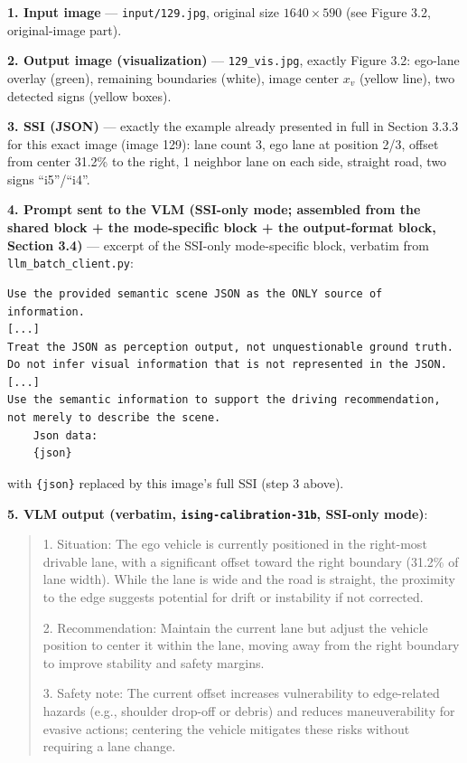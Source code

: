 \documentclass[12pt,a4paper]{report}
\begin{document}
\textbf{1. Input image} --- \texttt{input/129.jpg}, original size $1640 \times 590$ (see Figure 3.2, original-image part).

\textbf{2. Output image (visualization)} --- \texttt{129\_vis.jpg}, exactly Figure 3.2: ego-lane overlay (green), remaining boundaries (white), image center $x_v$ (yellow line), two detected signs (yellow boxes).

\textbf{3. SSI (JSON)} --- exactly the example already presented in full in Section 3.3.3 for this exact image (image 129): lane count 3, ego lane at position 2/3, offset from center 31.2\% to the right, 1 neighbor lane on each side, straight road, two signs ``i5''/``i4''.

\textbf{4. Prompt sent to the VLM (SSI-only mode; assembled from the shared block + the mode-specific block + the output-format block, Section 3.4)} --- excerpt of the SSI-only mode-specific block, verbatim from \texttt{llm\_batch\_client.py}:

{\small
\begin{verbatim}
Use the provided semantic scene JSON as the ONLY source of information.
[...]
Treat the JSON as perception output, not unquestionable ground truth.
Do not infer visual information that is not represented in the JSON.
[...]
Use the semantic information to support the driving recommendation, not merely to describe the scene.
    Json data:
    {json}
\end{verbatim}
}

with \texttt{\{json\}} replaced by this image's full SSI (step 3 above).

\textbf{5. VLM output (verbatim, \texttt{ising-calibration-31b}, SSI-only mode)}:

\begin{quote}
1. Situation: The ego vehicle is currently positioned in the right-most drivable lane, with a significant offset toward the right boundary (31.2\% of lane width). While the lane is wide and the road is straight, the proximity to the edge suggests potential for drift or instability if not corrected.

2. Recommendation: Maintain the current lane but adjust the vehicle position to center it within the lane, moving away from the right boundary to improve stability and safety margins.

3. Safety note: The current offset increases vulnerability to edge-related hazards (e.g., shoulder drop-off or debris) and reduces maneuverability for evasive actions; centering the vehicle mitigates these risks without requiring a lane change.
\end{quote}
\end{document}
